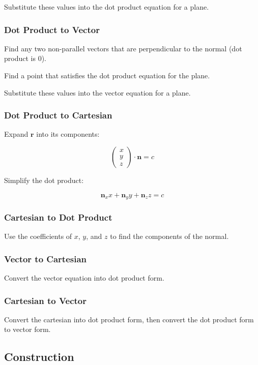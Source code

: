 \documentclass[a4paper,11pt]{article}
\newcommand{\bb}{\boldsymbol}
\begin{document}
Substitute these values into the dot product equation for a plane.


\subsubsection{Dot Product to Vector}

Find any two non-parallel vectors that are perpendicular to the normal (dot
product is 0).

Find a point that satisfies the dot product equation for the plane.

Substitute these values into the vector equation for a plane.


\subsubsection{Dot Product to Cartesian}

Expand $\bb{r}$ into its components:

$$
\begin{pmatrix} x \\ y \\ z \end{pmatrix} \cdot \bb{n} = c
$$

Simplify the dot product:

$$
\bb{n}_x x + \bb{n}_y y + \bb{n}_z z = c
$$


\subsubsection{Cartesian to Dot Product}

Use the coefficients of $x$, $y$, and $z$ to find the components of the normal.


\subsubsection{Vector to Cartesian}

Convert the vector equation into dot product form.


\subsubsection{Cartesian to Vector}

Convert the cartesian into dot product form, then convert the dot product form
to vector form.


\subsection{Construction}
\end{document}
